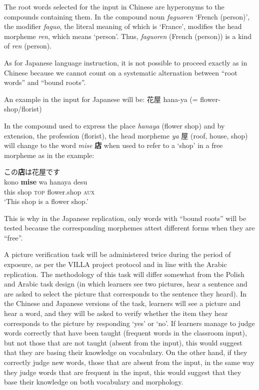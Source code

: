\documentclass[output=paper,colorlinks,citecolor=brown,modfonts,nonflat]{../langscibook}
\begin{document}
The root words selected for the input in Chinese are hyperonyms to the compounds containing them. In the compound noun \textit{faguoren} ‘French (person)’, the modifier \textit{faguo}, the literal meaning of which is ‘France’, modifies the head morpheme \textit{ren}, which means ‘person’. Thus, \textit{faguoren} (French (person)) is a kind of \textit{ren} (person). 

As for Japanese language instruction, it is not possible to proceed exactly as in Chinese because we cannot count on a systematic alternation between “root words” and “bound roots”.

An example in the input for Japanese will be:  {\cjkfont 花屋} hana-ya (= flower-shop\slash florist) 

In the compound used to express the place \textit{hanaya} (flower shop) and by extension, the profession (florist), the head morpheme \textit{ya} {\cjkfont 屋} (roof, house, shop) will change to the word \textit{mise} {\cjkfont\textbf{店}} when used to refer to a ‘shop’ in a free morpheme as in the example:


\ea%
    \label{ex:watorek:11}
                {\cjkfont この\textbf{店}は花屋です}\\
    \gll        kono \textbf{{mise}} wa hanaya desu\\
            this shop \textsc{top} flower.shop \textsc{aux}\\
    \glt    ‘This shop is a flower shop.’
\z

This is why in the Japanese replication, only words with “bound roots” will be tested because the corresponding morphemes attest different forms when they are “free”. 

A picture verification task will be administered twice during the period of exposure, as per the VILLA project protocol and in line with the Arabic replication. The methodology of this task will differ somewhat from the Polish and Arabic task design (in which learners see two pictures, hear a sentence and are asked to select the picture that corresponds to the sentence they heard). In the Chinese and Japanese versions of the task, learners will see a picture and hear a word, and they will be asked to verify whether the item they hear corresponds to the picture by responding ‘yes’ or ‘no’. If learners manage to judge words correctly that have been taught (frequent words in the classroom input), but not those that are not taught (absent from the input), this would suggest that they are basing their knowledge on vocabulary. On the other hand, if they correctly judge new words, those that are absent from the input, in the same way they judge words that are frequent in the input, this would suggest that they base their knowledge on both vocabulary and morphology.
\end{document}

